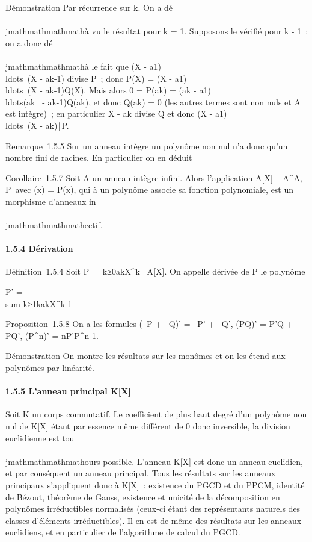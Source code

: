 Démonstration Par récurrence sur k. On a dé\\\\jmathmathmathmathà vu le résultat pour k = 1.
Supposons le vérifié pour k - 1~; on a donc dé\\\\jmathmathmathmathà le fait que (X -
a1)\\ldots~(X
- ak-1) divise P~; donc P(X) = (X -
a1)\\ldots~(X
- ak-1)Q(X). Mais alors 0 = P(ak) = (ak -
a1)\\ldots(ak~
- ak-1)Q(ak), et donc Q(ak) = 0 (les
autres termes sont non nuls et A est intègre)~; en particulier X -
ak divise Q et donc (X -
a1)\\ldots~(X
- ak)∣P.

Remarque~1.5.5 Sur un anneau intègre un polynôme non nul n'a donc qu'un
nombre fini de racines. En particulier on en déduit

Corollaire~1.5.7 Soit A un anneau intègre infini. Alors l'application
A{[}X{]} \rightarrow~ A^A,
P\mapsto~\tildeP avec
\tildeP(x) = P(x), qui à un polynôme associe sa
fonction polynomiale, est un morphisme d'anneaux in\\\\jmathmathmathmathectif.

\paragraph{1.5.4 Dérivation}

Définition~1.5.4 Soit P =\
\sum  k≥0akX^k~ \in
A{[}X{]}. On appelle dérivée de P le polynôme

P' = \\sum
k≥1kakX^k-1

Proposition~1.5.8 On a les formules (\alpha~P + \beta~Q)' = \alpha~P' + \beta~Q', (PQ)' = P'Q
+ PQ', (P^n)' = nP'P^n-1.

Démonstration On montre les résultats sur les monômes et on les étend
aux polynômes par linéarité.

\paragraph{1.5.5 L'anneau principal K{[}X{]}}

Soit K un corps commutatif. Le coefficient de plus haut degré d'un
polynôme non nul de K{[}X{]} étant par essence même différent de 0 donc
inversible, la division euclidienne est tou\\\\jmathmathmathmathours possible. L'anneau
K{[}X{]} est donc un anneau euclidien, et par conséquent un anneau
principal. Tous les résultats sur les anneaux principaux s'appliquent
donc à K{[}X{]}~: existence du PGCD et du PPCM, identité de Bézout,
théorème de Gauss, existence et unicité de la décomposition en polynômes
irréductibles normalisés (ceux-ci étant des représentants naturels des
classes d'éléments irréductibles). Il en est de même des résultats sur
les anneaux euclidiens, et en particulier de l'algorithme de calcul du
PGCD.

